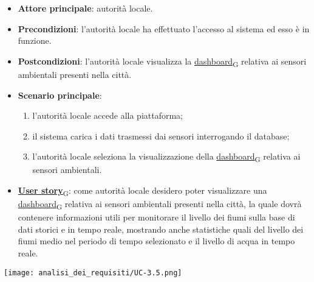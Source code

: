 \begin{itemize}
	\item \textbf{Attore principale}: autorità locale.
	\item \textbf{Precondizioni}: l'autorità locale ha effettuato l'accesso al sistema ed esso è in funzione.
	\item \textbf{Postcondizioni}: l'autorità locale visualizza la \href{https://7last.github.io/docs/pb/documentazione-interna/glossario\#dashboard}{dashboard\textsubscript{G}} relativa
	      ai sensori ambientali presenti nella città.
	\item \textbf{Scenario principale}:
	      \begin{enumerate}
		      \item l'autorità locale accede alla piattaforma;
		      \item il sistema carica i dati trasmessi dai sensori interrogando il database;
		      \item l'autorità locale seleziona la visualizzazione della \href{https://7last.github.io/docs/pb/documentazione-interna/glossario\#dashboard}{dashboard\textsubscript{G}} relativa ai sensori ambientali.
	      \end{enumerate}
	\item \href{https://7last.github.io/docs/pb/documentazione-interna/glossario\#user-story}{\textbf{User story}\textsubscript{G}}:
	      come autorità locale desidero poter visualizzare una \href{https://7last.github.io/docs/pb/documentazione-interna/glossario\#dashboard}{dashboard\textsubscript{G}} relativa ai sensori ambientali presenti nella città, la quale
	      dovrà contenere informazioni utili per monitorare il livello dei fiumi sulla base di dati storici e in tempo reale, mostrando
	      anche statistiche quali del livello dei fiumi medio nel periodo di tempo selezionato e il livello di acqua in tempo reale.
\end{itemize}
\begin{center}
	\texttt{[image: analisi\_dei\_requisiti/UC-3.5.png]}
\end{center}


